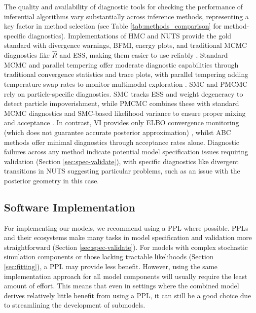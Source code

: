 \documentclass{article}
\begin{document}
The quality and availability of diagnostic tools for checking the performance of inferential algorithms vary substantially across inference methods, representing a key factor in method selection (see Table \ref{tab:methods_comparison} for method-specific diagnostics).
Implementations of \ac{HMC} and \ac{NUTS} provide the gold standard with divergence warnings, \ac{BFMI}, energy plots, and traditional \ac{MCMC} diagnostics like $\hat{R}$ and \ac{ESS}, making them easier to use reliably \citep{betancourt2017conceptual, carpenter2017stan}.
 Standard \ac{MCMC} and parallel tempering offer moderate diagnostic capabilities through traditional convergence statistics and trace plots, with parallel tempering adding temperature swap rates to monitor multimodal exploration \citep{honkela2020computational}. \ac{SMC} and \ac{PMCMC} rely on particle-specific diagnostics. \ac{SMC} tracks \ac{ESS} and weight degeneracy to detect particle impoverishment, while \ac{PMCMC} combines these with standard \ac{MCMC} diagnostics and \ac{SMC}-based likelihood variance to ensure proper mixing and acceptance \citep{michaud2021sequential, andrieu2010particle}.  In contrast, \ac{VI} provides only \ac{ELBO} convergence monitoring (which does not guarantee accurate posterior approximation) \citep{blei2017variational, chatzilena2019contemporary}, whilst \ac{ABC} methods offer minimal diagnostics through acceptance rates alone.
Diagnostic failures across any method indicate potential model specification issues requiring validation (Section \ref{sec:spec-validate}), with specific diagnostics like divergent transitions in \ac{NUTS} suggesting particular problems, such as an issue with the posterior geometry in this case.

\subsection{Software Implementation}\label{sec:implementation}

For implementing our models, we recommend using a \ac{PPL} where possible.
\ac{PPL}s and their ecosystems make many tasks in model specification and validation more straightforward (Section \ref{sec:spec-validate}).
For models with complex stochastic simulation components or those lacking tractable likelihoods (Section \ref{sec:fitting}), a \ac{PPL} may provide less benefit.
However, using the same implementation approach for all model components will usually require the least amount of effort.
This means that even in settings where the combined model derives relatively little benefit from using a  \ac{PPL}, it can still be a good choice due to streamlining the development of submodels.
\end{document}
